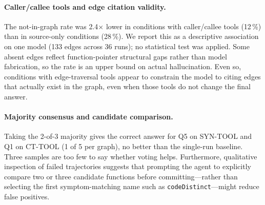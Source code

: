 \paragraph{Caller/callee tools and edge citation validity.}
The not-in-graph rate was 2.4$\times$ lower in conditions with caller/callee
tools (12\,\%) than in source-only conditions (28\,\%).
We report this as a descriptive association on one model (133 edges across 36
runs); no statistical test was applied.
Some absent edges reflect function-pointer structural gaps rather than model
fabrication, so the rate is an upper bound on actual hallucination.
Even so, conditions with edge-traversal tools appear to constrain the model to
citing edges that actually exist in the graph, even when those tools do not
change the final answer.

\paragraph{Majority consensus and candidate comparison.}
Taking the 2-of-3 majority gives the correct answer for Q5 on \textsc{SYN-TOOL} and Q1 on
\textsc{CT-TOOL} (1 of 5 per graph), no better than the single-run baseline.
Three samples are too few to say whether voting helps.
Furthermore, qualitative inspection of failed trajectories suggests that prompting the
agent to explicitly compare two or three candidate functions before committing---rather
than selecting the first symptom-matching name such as \texttt{codeDistinct}---might
reduce false positives.
